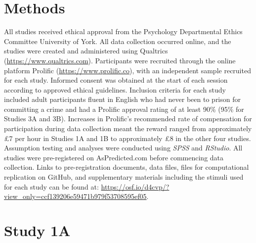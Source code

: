 \documentclass[
]{article}
\begin{document}
\hypertarget{methods}{%
\section{Methods}\label{methods}}

All studies received ethical approval from the Psychology Departmental Ethics Committee University of York. All data collection occurred online, and the studies were created and administered using Qualtrics (\url{https://www.qualtrics.com}). Participants were recruited through the online platform Prolific (\url{https://www.prolific.co}), with an independent sample recruited for each study. Informed consent was obtained at the start of each session according to approved ethical guidelines. Inclusion criteria for each study included adult participants fluent in English who had never been to prison for committing a crime and had a Prolific approval rating of at least 90\% (95\% for Studies 3A and 3B). Increases in Prolific's recommended rate of compensation for participation during data collection meant the reward ranged from approximately £7 per hour in Studies 1A and 1B to approximately £8 in the other four studies. Assumption testing and analyses were conducted using \emph{SPSS} and \emph{RStudio}. All studies were pre-registered on AsPredicted.com before commencing data collection. Links to pre-registration documents, data files, files for computational replication on GitHub, and supplementary materials including the stimuli used for each study can be found at: \url{https://osf.io/d4cvp/?view_only=ccf139206e59471b979f53708595ef05}.

\hypertarget{study-1a}{%
\section{Study 1A}\label{study-1a}}
\end{document}
